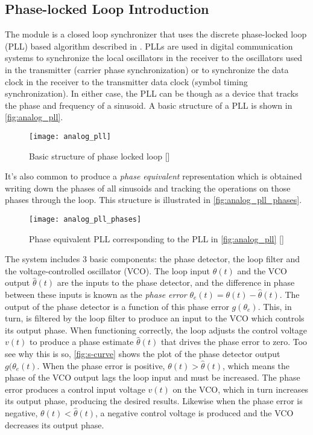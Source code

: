 \subsection{Phase-locked Loop Introduction}
\label{sect:pll_intro}
The module is a closed loop synchronizer that uses the discrete phase-locked loop (PLL) based algorithm described in \cite{digcomm_discrete_approach}. PLLs are used in digital communication systems to synchronize the local oscillators in the receiver to the oscillators used in the transmitter (carrier phase synchronization) or to synchronize the data clock in the receiver to the transmitter data clock (symbol timing synchronization). In either case, the PLL can be though as a device that tracks the phase and frequency of a sinusoid. A basic structure of a PLL is shown in \autoref{fig:analog_pll}.

\begin{figure}[ht]
  \centering
  \texttt{[image: analog\_pll]}
  \caption{Basic structure of phase locked loop [\citeauthor{digcomm_discrete_approach}]}
  \label{fig:analog_pll}
\end{figure}

It's also common to produce a \emph{phase equivalent} representation which is obtained writing down the phases of all sinusoids and tracking the operations on those phases through the loop. This structure is illustrated in \autoref{fig:analog_pll_phases}.

\begin{figure}[ht]
  \centering
  \texttt{[image: analog\_pll\_phases]}
  \caption{Phase equivalent PLL corresponding to the PLL in \autoref{fig:analog_pll} [\citeauthor{digcomm_discrete_approach}]}
  \label{fig:analog_pll_phases}
\end{figure}

The system includes 3 basic components: the phase detector, the loop filter and the voltage-controlled oscillator (VCO). The loop input $\theta(t)$ and the VCO output $\hat\theta(t)$ are the inputs to the phase detector, and the difference in phase between these inputs is known as the \emph{phase error} $\theta_e(t)=\theta(t) -\hat\theta(t)$. The output of the phase detector is a function of this phase error $g(\theta_e)$. This, in turn, is filtered by the loop filter to produce an input to the VCO which controls its output phase. When functioning correctly, the loop adjusts the control voltage $v(t)$ to produce a phase estimate $\hat\theta(t)$ that drives the phase error to zero. Too see why this is so, \autoref{fig:s-curve} shows the plot of the phase detector output $g(\theta_e(t)$. When the phase error is positive, $\theta(t) > \hat \theta(t)$, which means the phase of the VCO output lags the loop input and must be increased. The phase error produces a control input voltage $v(t)$ on the VCO, which in turn increases its output phase, producing the desired results. Likewise when the phase error is negative, $\theta(t) < \hat \theta(t)$, a negative control voltage is produced and the VCO decreases its output phase.


